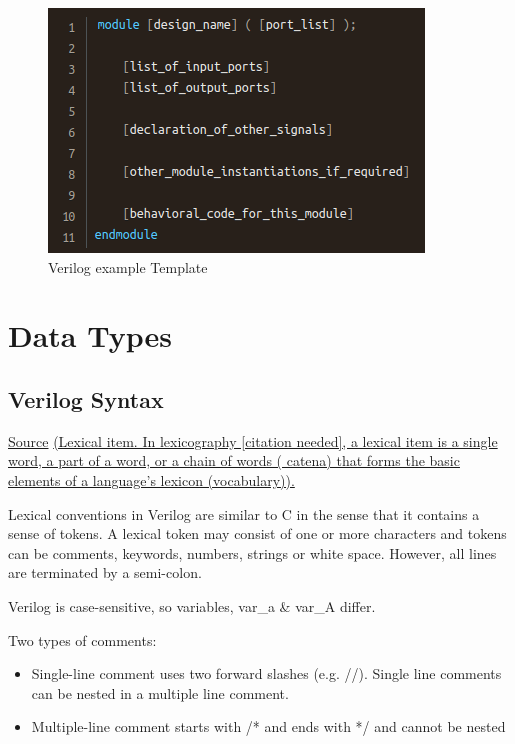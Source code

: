 \documentclass{article}
\begin{document}
	\begin{figure}[H]
		\includegraphics[width=\linewidth]{VerilogPics/figure_2.png}
		\caption{Verilog example Template}
		\label{Verilog Template}
	\end{figure}

	\section{Data Types}
	\subsection{Verilog Syntax}

	\href{https://www.chipverify.com/verilog/verilog-syntax}{Source} 
	\href{https://en.wikipedia.org/wiki/Lexical_item}{(Lexical item. In lexicography [citation needed], a lexical item is a single word, a part of a word, or a chain of words ( catena) that forms the basic elements of a language's lexicon (vocabulary)).} \newline \newline

	Lexical conventions in Verilog are similar to C in the sense that it contains a sense of tokens. A lexical token may consist of one or more characters and tokens can be comments, keywords, numbers, strings or white space. However, all lines are terminated by a semi-colon. \newline

	Verilog is case-sensitive, so variables, var\_a \& var\_A differ.


	Two types of comments:
	\begin{itemize}
		\item Single-line comment uses two forward slashes (e.g. //). Single line comments can be nested in a multiple line comment.
		\item Multiple-line comment starts with /* and ends with */ and cannot be nested
	\end{itemize} 
	
\end{document}
